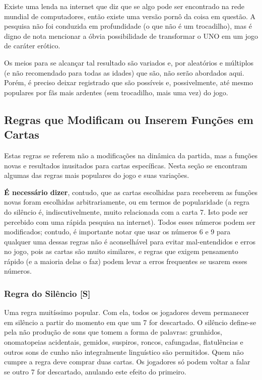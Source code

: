 Existe uma lenda na internet que diz que se algo pode ser encontrado na rede mundial de computadores, então existe uma versão pornô da coisa em questão. A pesquisa não foi conduzida em profundidade (o que não é um trocadilho), mas é digno de nota mencionar a óbvia possibilidade de transformar o UNO em um jogo de caráter erótico.

Os meios para se alcançar tal resultado são variados e, por aleatórios e múltiplos (e não recomendado para todas as idades) que são, não serão abordados aqui. Porém, é preciso deixar registrado que são possíveis e, possivelmente, até mesmo populares por fãs mais ardentes (sem trocadilho, mais uma vez) do jogo.

\subsection{Regras que Modificam ou Inserem Funções em Cartas}

Estas regras se referem não a modificações na dinâmica da partida, mas a funções novas e resultados inusitados para cartas específicas. Nesta seção se encontram algumas das regras mais populares do jogo e suas variações.

\textbf{É necessário dizer}, contudo, que as cartas escolhidas para receberem as funções novas foram escolhidas arbitrariamente, ou em termos de popularidade (a regra do silêncio é, indiscutivelmente, muito relacionada com a carta 7. Isto pode ser percebido com uma rápida pesquisa na internet). Todos esses números podem ser modificados; contudo, é importante notar que usar os números 6 e 9 para qualquer uma dessas regras não é aconselhável para evitar mal-entendidos e erros no jogo, pois as cartas são muito similares, e regras que exigem pensamento rápido (e a maioria delas o faz) podem levar a erros frequentes se usarem esses números. 

\subsubsection{Regra do Silêncio [S]}

Uma regra muitíssimo popular. Com ela, todos os jogadores devem permanecer em silêncio a partir do momento em que um 7 for descartado. O silêncio define-se pela não produção de sons que tomem a forma de palavras: grunhidos, onomatopeias acidentais, gemidos, suspiros, roncos, cafungadas, flatulências e outros sons de cunho não integralmente linguístico são permitidos. Quem não cumpre a regra deve comprar duas cartas. Os jogadores só podem voltar a falar se outro 7 for descartado, anulando este efeito do primeiro.

